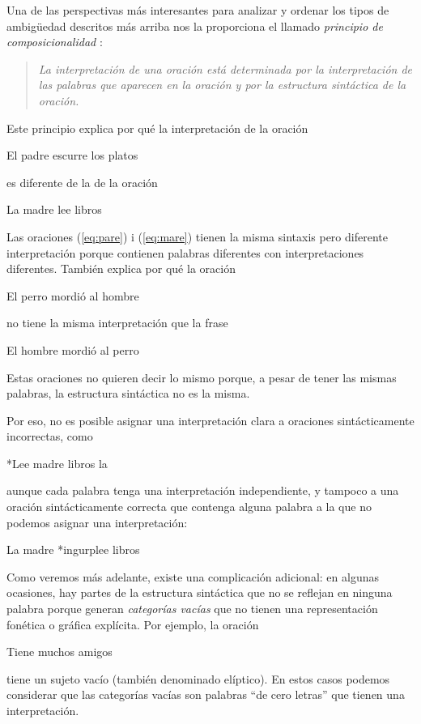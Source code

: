 Una de las perspectivas más interesantes para analizar y ordenar los tipos de ambigüedad descritos más arriba nos la proporciona el llamado \emph{principio de composicionalidad} \citep[cap.~23]{radford09b}: \begin{quote} {\sl La interpretación de una oración está determinada por la interpretación de las palabras que aparecen en la oración y por la estructura sintáctica de la oración.} \end{quote} Este principio explica por qué la interpretación de la oración \begin{exemple} \label{eq:pare} El padre escurre los platos \end{exemple} es diferente de la de la oración \begin{exemple} La madre lee libros \label{eq:mare} \end{exemple} Las oraciones (\ref{eq:pare}) i (\ref{eq:mare}) tienen la misma sintaxis pero diferente interpretación porque contienen palabras diferentes con interpretaciones diferentes. También explica por qué la oración \begin{exemple} El perro mordió al hombre \end{exemple} no tiene la misma interpretación que la frase \begin{exemple} El hombre mordió al perro \end{exemple} Estas oraciones no quieren decir lo mismo porque, a pesar de tener las mismas palabras, la estructura sintáctica no es la misma. 

Por eso, no es posible asignar una interpretación clara a oraciones sintácticamente incorrectas, como \begin{exemple} *Lee madre libros la \end{exemple} aunque cada palabra tenga una interpretación independiente, y tampoco a una oración sintácticamente correcta que contenga alguna palabra a la que no podemos asignar una interpretación: \begin{exemple} La madre *ingurplee libros \end{exemple} Como veremos más adelante, existe una complicación adicional: en algunas ocasiones, hay partes de la estructura sintáctica que no se reflejan en ninguna palabra porque generan \emph{categorías vacías} que no tienen una representación fonética o gráfica explícita. Por ejemplo, la oración \begin{exemple} Tiene muchos amigos \end{exemple} tiene un sujeto vacío (también denominado elíptico). En estos casos podemos considerar que las categorías vacías son palabras ``de cero letras'' que tienen una interpretación. 


